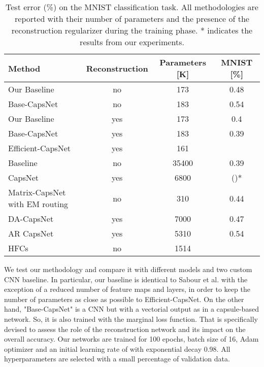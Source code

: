 \documentclass{article}
\begin{document}
\begin{table}[b]
\centering
\begin{tabular}{lccc}
\toprule
Method            & Reconstruction & Parameters {[}K{]} & MNIST {[}\%{]}                  \\ \hline
Our Baseline      & no              & 173                & 0.48                        \\ 
Base-CapsNet      & no              & 183                & 0.54                        \\ 
Our Baseline      & yes              & 173                & 0.4                         \\ 
Base-CapsNet       & yes              & 183                & 0.39                        \\ 
Efficient-CapsNet & yes              & 161                &               \\ \hline
Baseline\cite{sabour2017dynamic}          & no              & 35400              & 0.39                        \\ 
CapsNet\cite{sabour2017dynamic}           & yes              & 6800               &  ()* \\
Matrix-CapsNet with EM routing\cite{hinton2018matrix}  & no              & 310               & 0.44                        \\ 
DA-CapsNet \cite{huang2020capsnet}        & yes              & 7000               & 0.47                        \\ 
AR CapsNet \cite{choi2019attention} & yes & 5310 & 0.54 \\
HFCs \cite{byerly2020branching}              & no              & 1514               &               \\ \bottomrule
\end{tabular}
\caption{Test error (\%) on the MNIST classification task. All methodologies are reported with their number of parameters and the presence of the reconstruction regularizer during the training phase. * indicates the results from our experiments.}
\label{tab:mnist_results}
\end{table}
We test our methodology and compare it with different models and two custom CNN baseline. In particular, our baseline is identical to Sabour et al.\cite{sabour2017dynamic} with the exception of a reduced number of feature maps and layers, in order to keep the number of parameters as close as possible to Efficient-CapsNet. On the other hand, "Base-CapsNet" is a CNN but with a vectorial output as in a capsule-based network. So, it is also trained with the marginal loss function. That is specifically devised to assess the role of the reconstruction network and its impact on the overall accuracy. Our networks are trained for 100 epochs, batch size of 16, Adam \cite{kingma2014adam} optimizer and an initial learning rate of  with exponential decay 0.98. All hyperparameters are selected with a small percentage of validation data.
\end{document}
